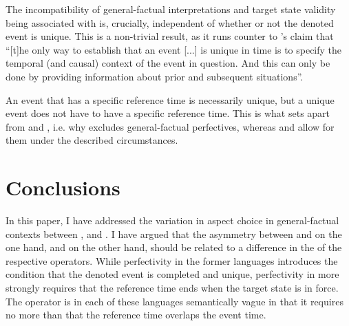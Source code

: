 \documentclass[output=paper,modfonts,newtxmath,hidelinks]{langscibook}
\begin{document}
The incompatibility of general-factual interpretations and target state validity being associated with  
is, crucially, independent of whether or not the denoted event is unique. 
This is a non-trivial result, as it runs counter to \cite{Dickey18}'s claim that ``[t]he only way to establish that an event [...] is unique in time is to specify the temporal (and causal) context of the event in question. And this can only be done by providing information about prior and subsequent situations''.

An event that has a specific reference time is necessarily unique, but a unique event does not have to have a specific reference time.
This is what sets  apart from  and , i.e. why  excludes general-factual perfectives, whereas  and  allow for them under the described circumstances.

\section{Conclusions}\label{13:s9} 
In this paper, I have addressed the variation in aspect choice in general-factual contexts between ,  and . 
I have argued that the asymmetry between  and  on the one hand, and  on the other hand, 
should be related to a difference in the  of the respective  operators. While perfectivity in the former languages 
introduces the condition that the denoted event is completed and unique, perfectivity in  more strongly requires 
that the reference time ends when the target state is in force. The  operator is in each of these languages semantically vague in that it requires no more than that the reference time overlaps the event time. 
\end{document}
